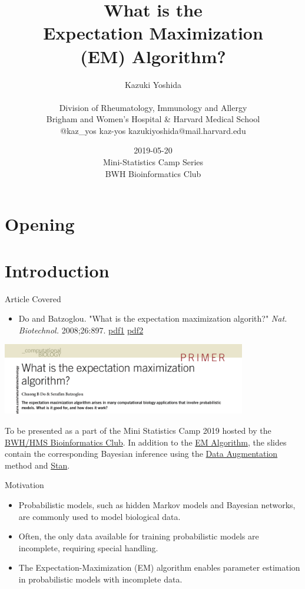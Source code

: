 \documentclass[dvipdfmx,bigger,aspectratio=169]{beamer}
\author{Kazuki Yoshida \\ \\ Division of Rheumatology, Immunology and Allergy \\ Brigham and Women's Hospital \& Harvard Medical School \\ \faTwitter @kaz\_yos \faGithub kaz-yos \faEnvelope kazukiyoshida@mail.harvard.edu}
\date{2019-05-20\\ Mini-Statistics Camp Series \\ BWH Bioinformatics Club \\}
\title{What is the \\ Expectation Maximization \\ (EM) Algorithm? \\}
\begin{document}
\maketitle
\section{Opening}
\label{sec:org780cacb}


\section{Introduction}
\label{sec:orgc04c78e}
\begin{frame}[label={sec:org053d81e}]{Article Covered}
\begin{itemize}
\item Do and Batzoglou. "What is the expectation maximization algorith?" \emph{Nat. Biotechnol.} 2008;26:897. \cite{doWhatExpectationMaximization2008} \href{https://www.cmi.ac.in/\~madhavan/courses/dmml2019jan/literature/EM\_algorithm\_2coin\_example.pdf}{pdf1} \href{http://www.utdallas.edu/\~prr105020/biol6385/2019/lecture/lecture\_4\_em\_paper.pdf}{pdf2}
\end{itemize}
\begin{center}
\includegraphics[page=1,keepaspectratio,width=0.8\textwidth]{./source/em_algo.png}
\end{center}
\footnotesize
To be presented as a part of the Mini Statistics Camp 2019 hosted by the \href{http://bioinformatics.bwh.harvard.edu}{BWH/HMS Bioinformatics Club}. In addition to the \hyperlink{sec:orge51736c}{EM Algorithm}, the slides contain the corresponding Bayesian inference using the \hyperlink{sec:orga3444c4}{Data Augmentation} method and \hyperlink{sec:orgdd0290a}{Stan}.
\end{frame}

\begin{frame}[label={sec:orgbc5c7a5}]{Motivation}
\begin{itemize}
\item Probabilistic models, such as hidden Markov models and Bayesian networks, are commonly used to model biological data.
\end{itemize}


\begin{itemize}
\item Often, the only data available for training probabilistic models are incomplete, requiring special handling.
\end{itemize}


\begin{itemize}
\item The Expectation-Maximization (EM) algorithm enables parameter estimation in probabilistic models with incomplete data.
\end{itemize}
\end{frame}
\end{document}
